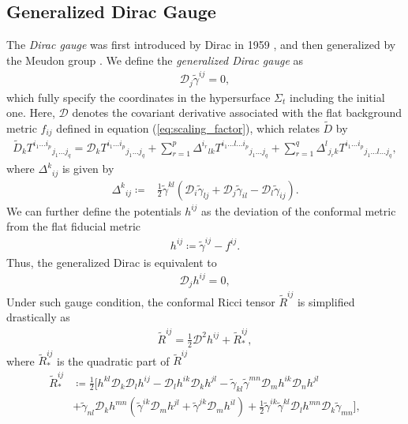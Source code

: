 \subsection{Generalized Dirac Gauge}
\label{section2.4.2}
The \textit{Dirac gauge} was first introduced by Dirac in 1959 \cite{dirac1959fixation},
and then generalized by the Meudon group \cite{bonazzola2004constrained}.
We define the \textit{generalized Dirac gauge} as
\begin{align}\label{eq:dirac_gauge_1}
    \mathcal{D}_j \tilde{\gamma}^{ij} = 0,
\end{align}
which fully specify the coordinates in the hypersurface $\Sigma_t$ including the initial one.
Here, $\mathcal{D}$ denotes the covariant derivative associated with the flat background metric $f_{ij}$ defined in equation (\ref{eq:scaling_factor}),
which relates $\tilde{D}$ by
\begin{align}
    \tilde{D}_k T^{i_1 \dots i_p}{}_{j_1 \dots j_q} = \mathcal{D}_k T^{i_1 \dots i_p}{}_{j_1 \dots j_q} 
    + \sum_{r=1}^p \Delta^{i_r}{}_{lk} T^{i_1 \dots l \dots i_p}{}_{j_1 \dots j_q}
    + \sum_{r=1}^q \Delta^{l}{}_{j_r k} T^{i_1 \dots i_p}{}_{j_1 \dots l \dots j_q},
\end{align}
where $\Delta^{k}{}_{ij}$ is given by
\begin{align}
    \Delta^k{}_{ij} \coloneqq& \frac{1}{2} \tilde{\gamma}^{kl} \left( \mathcal{D}_i \tilde{\gamma}_{lj} + \mathcal{D}_j \tilde{\gamma}_{il}
    - \mathcal{D}_l \tilde{\gamma}_{ij} \right).
\end{align}
We can further define the potentials $h^{ij}$ as the deviation of the conformal metric from the flat fiducial metric
\begin{align}
    h^{ij} \coloneqq \tilde{\gamma}^{ij} - f^{ij}.
\end{align}
Thus, the generalized Dirac is equivalent to
\begin{align}
    \mathcal{D}_j h^{ij} = 0,
\end{align}
Under such gauge condition, the conformal Ricci tensor $\tilde{R}^{ij}$ is simplified drastically as
\begin{align}
    \tilde{R}^{ij} = \frac{1}{2} \mathcal{D}^2 h^{ij} + \tilde{R}^{ij}_{*},
\end{align}
where $\tilde{R}^{ij}_{*}$ is the quadratic part of $\tilde{R}^{ij}$
\begin{align}
    \tilde{R}^{ij}_{*} &\coloneq \frac{1}{2} \biggl[ h^{kl} \mathcal{D}_k \mathcal{D}_l h^{ij} - \mathcal{D}_l h^{ik} \mathcal{D}_k h^{jl}
    - \tilde{\gamma}_{kl} \tilde{\gamma}^{mn} \mathcal{D}_m h^{ik} \mathcal{D}_n h^{jl} \\
    & + \tilde{\gamma}_{nl} \mathcal{D}_k h^{mn} \left( \tilde{\gamma}^{ik} \mathcal{D}_m h^{jl} + \tilde{\gamma}^{jk} \mathcal{D}_m h^{il} \right)
    + \frac{1}{2} \tilde{\gamma}^{ik} \tilde{\gamma}^{kl} \mathcal{D}_l h^{mn} \mathcal{D}_k \tilde{\gamma}_{mn} \biggr],
\end{align}
